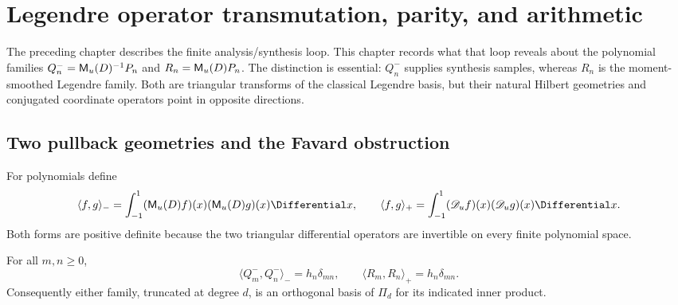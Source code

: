 
\newcommand{\MonicDeconvolvedLegendre}[1]{\widehat Q_{#1}^{-}}
\newcommand{\GenericMonicOrthogonalPolynomial}[1]{\widehat Q_{#1}}

\section{Legendre operator transmutation, parity, and arithmetic}
\label{sec:legendre-transmutation}

The preceding chapter describes the finite analysis/synthesis loop.  This
chapter records what that loop reveals about the polynomial families
$Q_n^-=\mathsf M_u(D)^{-1}P_n$ and $R_n=\mathsf M_u(D)P_n$.  The distinction is essential:
$Q_n^-$ supplies synthesis samples, whereas $R_n$ is the moment-smoothed
Legendre family.  Both are triangular transforms of the classical Legendre
basis, but their natural Hilbert geometries and conjugated coordinate
operators point in opposite directions.

\subsection{Two pullback geometries and the Favard obstruction}

For polynomials define
\begin{equation}
 \langle f,g\rangle_-=
 \int_{-1}^{1}(\MM_u(D)f)(x)(\MM_u(D)g)(x)\Differential x,
 \qquad
 \langle f,g\rangle_+=
 \int_{-1}^{1}(\mathscr D_uf)(x)(\mathscr D_ug)(x)\Differential x.
 \label{eq:leg2-pullback-inner-products}
\end{equation}
Both forms are positive definite because the two triangular differential
operators are invertible on every finite polynomial space.

\begin{theorem}
\label{thm:leg2-dual-pullback}
For all $m,n\ge0$,
\begin{equation}
 \boxed{\langle Q_m^-,Q_n^-\rangle_-=h_n\delta_{mn},
 \qquad
 \langle R_m,R_n\rangle_+=h_n\delta_{mn}.}
 \label{eq:leg2-dual-pullback}
\end{equation}
Consequently either family, truncated at degree $d$, is an orthogonal basis of
$\Pi_d$ for its indicated inner product.
\end{theorem}

